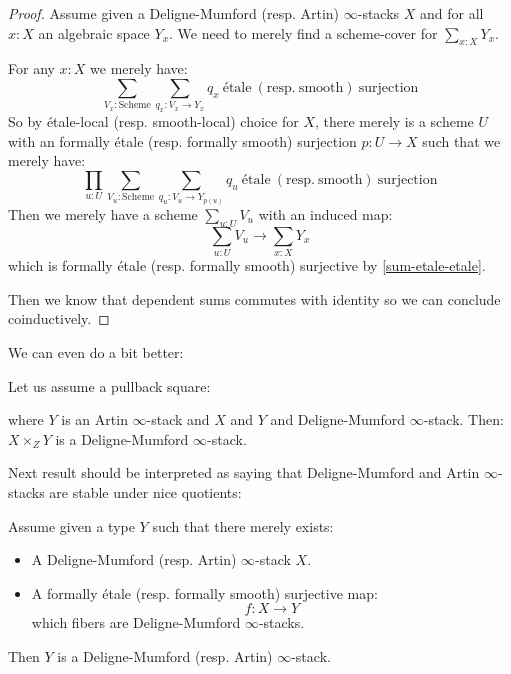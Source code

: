 \begin{proof}
Assume given a Deligne-Mumford (resp. Artin) $\infty$-stacks $X$ and for all $x:X$ an algebraic space $Y_x$. We need to merely find a scheme-cover for $\sum_{x:X} Y_x$. 

For any $x:X$ we merely have:
\[\sum_{V_x:\mathrm{Scheme}} \sum_{q_x: V_x \to Y_x} q_x\ \mathrm{étale\ (resp.\ smooth)\ surjection}\]
So by étale-local (resp. smooth-local) choice for $X$, there merely is a scheme $U$ with an formally étale (resp. formally smooth) surjection $p: U \to X$ such that we merely have:
\[\prod_{u:U} \sum_{V_u:\mathrm{Scheme}} \sum_{q_u: V_u \to Y_{p(u)}} q_u\ \mathrm{étale\ (resp.\ smooth)\ surjection}\]
Then we merely have a scheme $\sum_{u:U}V_u$ with an induced map:
\[\sum_{u:U}V_u \to \sum_{x:X} Y_x\]
which is formally étale (resp. formally smooth) surjective by \cref{sum-etale-etale}.

Then we know that dependent sums commutes with identity so we can conclude coinductively.
\end{proof}

We can even do a bit better:

\begin{lemma}
Let us assume a pullback square:
 \begin{center}
  \end{center}
 where $Y$ is an Artin $\infty$-stack and $X$ and $Y$ and Deligne-Mumford $\infty$-stack. Then:
 $X\times_ZY$ is a Deligne-Mumford $\infty$-stack.
\end{lemma}

Next result should be interpreted as saying that Deligne-Mumford and Artin $\infty$-stacks are stable under nice quotients:

\begin{proposition}\label{infty-stacks-quotients}
Assume given a type $Y$ such that there merely exists:
\begin{itemize} 
\item A Deligne-Mumford (resp. Artin) $\infty$-stack $X$.
\item A formally étale (resp. formally smooth) surjective map:
\[f:X\to Y\]
which fibers are Deligne-Mumford $\infty$-stacks. 
\end{itemize}
Then $Y$ is a Deligne-Mumford (resp. Artin) $\infty$-stack.
\end{proposition}

